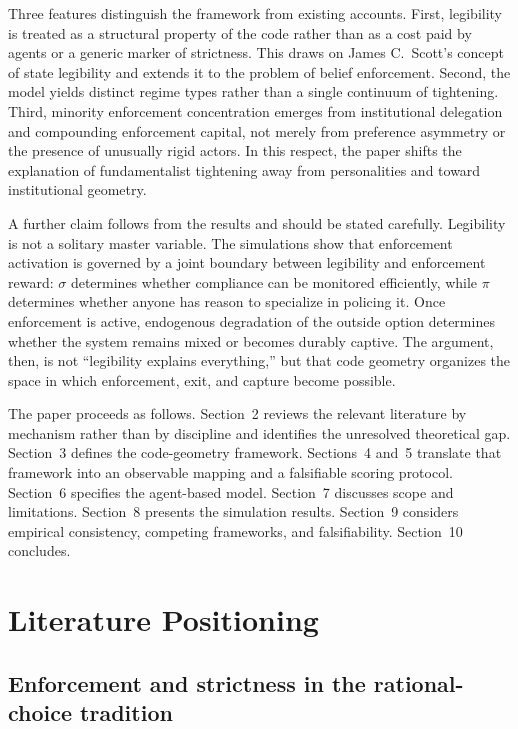 \documentclass[12pt]{article}
\begin{document}
Three features distinguish the framework from existing accounts. First, legibility is treated as a structural property of the code rather than as a cost paid by agents or a generic marker of strictness. This draws on James C.\ Scott's concept of state legibility and extends it to the problem of belief enforcement. Second, the model yields distinct regime types rather than a single continuum of tightening. Third, minority enforcement concentration emerges from institutional delegation and compounding enforcement capital, not merely from preference asymmetry or the presence of unusually rigid actors. In this respect, the paper shifts the explanation of fundamentalist tightening away from personalities and toward institutional geometry.

A further claim follows from the results and should be stated carefully. Legibility is not a solitary master variable. The simulations show that enforcement activation is governed by a joint boundary between legibility and enforcement reward: $\sigma$ determines whether compliance can be monitored efficiently, while $\pi$ determines whether anyone has reason to specialize in policing it. Once enforcement is active, endogenous degradation of the outside option determines whether the system remains mixed or becomes durably captive. The argument, then, is not ``legibility explains everything,'' but that code geometry organizes the space in which enforcement, exit, and capture become possible.

The paper proceeds as follows. Section~2 reviews the relevant literature by mechanism rather than by discipline and identifies the unresolved theoretical gap. Section~3 defines the code-geometry framework. Sections~4 and~5 translate that framework into an observable mapping and a falsifiable scoring protocol. Section~6 specifies the agent-based model. Section~7 discusses scope and limitations. Section~8 presents the simulation results. Section~9 considers empirical consistency, competing frameworks, and falsifiability. Section~10 concludes.



\section{Literature Positioning}

\subsection{Enforcement and strictness in the rational-choice tradition}
\end{document}
